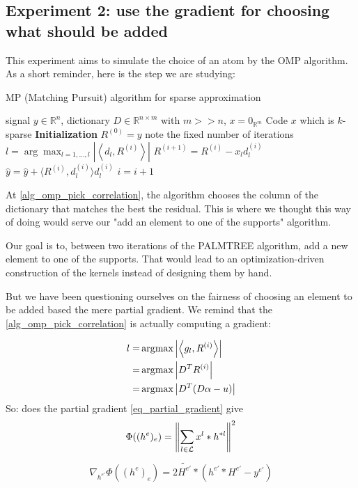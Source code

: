 \subsection{Experiment 2: use the gradient for choosing what should be added}
This experiment aims to simulate the choice of an atom by the OMP algorithm. As a short reminder, here is the step we are studying:
\begin{algorithm}[!ht] %
    \caption{MP (Matching Pursuit) algorithm for sparse approximation}
  \begin{algorithmic}[0]
    \Input signal $y \in \mathbb{R}^{n}$, dictionary $D \in \mathbb{R}^{n \times m}$ with $m>>n$, $x = 0_{\mathbb{R}^m}$
    \Output Code $x$ which is $k$-sparse
    \State \textbf{Initialization} $R^{(0)} = y$
     \Comment note the fixed number of iterations
      \State $l =  \arg\max_{l = 1,\dots,l} |\left< d_l,R^{(i)} \right>|$ \label{alg_omp_pick_correlation}
      \State $R^{(i+1)} = R^{(i)}-x_l d_l^{(i)}$
      \State $\hat{y} = \hat{y}+\langle R^{(i)}, d_{l}^{(i)} \rangle d_{l}^{(i)}$
      \State $i = i + 1$
    \EndWhile
  \end{algorithmic}
\end{algorithm}

At \cref{alg_omp_pick_correlation}, the algorithm chooses the column of the dictionary that matches the best the residual. This is where we thought this way of doing would serve our "add an element to one of the supports" algorithm.

Our goal is to, between two iterations of the PALMTREE algorithm, add a new element to one of the supports. That would lead to an optimization-driven construction of the kernels instead of designing them by hand.

But we have been questioning ourselves on the fairness of choosing an element to be added based the mere partial gradient. We remind that the \ref{alg_omp_pick_correlation} is actually computing a gradient:

\begin{align*}
l =& \operatorname*{\arg\!\max} \left|\left< g_l,R^{(i)} \right>\right| \\
=& \operatorname*{\arg\!\max} \left| D^TR^{(i)}\right| \\
=& \operatorname*{\arg\!\max} \left| D^T(D\alpha - u)\right| \\
\end{align*}
So: does the partial gradient \ref{eq_partial_gradient} give 
\begin{align*}
\Phi((h^e)_e) = \left\| \sum_{l\in\mathcal L} x^l * h^{*l} \right\|^2
\end{align*}
\begin{align*} 
\nabla_{h^{e'}}\Phi((h^e)_e) = 2 \widetilde{H^{e'}} * (h^{e'}*H^{e'}-y^{e'})
\end{align*} \label{eq_partial_gradient}


